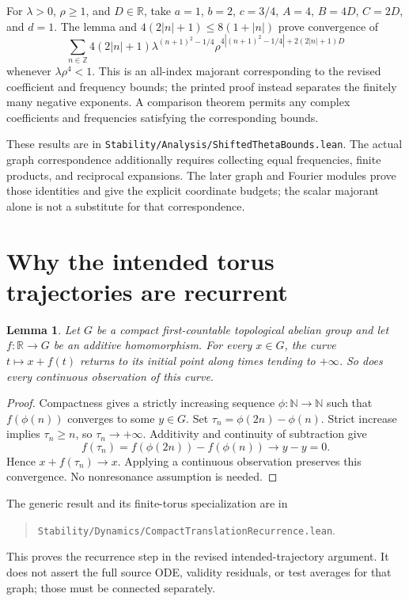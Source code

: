 \documentclass[11pt]{article}
\newtheorem{lemma}[theorem]{Lemma}
\newcommand{\R}{\mathbb R}
\newcommand{\N}{\mathbb N}
\newcommand{\Z}{\mathbb Z}
\newcommand{\code}[1]{{\small\nolinkurl{#1}}}
\begin{document}
For $\lambda>0$, $\rho\ge1$, and $D\in\R$, take $a=1$, $b=2$,
$c=3/4$, $A=4$, $B=4D$, $C=2D$, and $d=1$. The lemma and
$4(2|n|+1)\le8(1+|n|)$ prove convergence of
\[
 \sum_{n\in\Z}4(2|n|+1)\lambda^{(n+1)^2-1/4}
 \rho^{4|(n+1)^2-1/4|+2(2|n|+1)D}
\]
whenever $\lambda\rho^4<1$. This is an all-index majorant corresponding to
the revised coefficient and frequency bounds; the printed proof instead
separates the finitely many negative exponents. A comparison theorem permits any complex coefficients
and frequencies satisfying the corresponding bounds.

These results are in
\code{Stability/Analysis/ShiftedThetaBounds.lean}. The actual graph
correspondence additionally requires collecting equal frequencies, finite
products, and reciprocal expansions. The later graph and Fourier modules
prove those identities and give the explicit coordinate budgets; the
scalar majorant alone is not a substitute for that correspondence.

\section{Why the intended torus trajectories are recurrent}

\begin{lemma}
Let $G$ be a compact first-countable topological abelian group and let
$f:\R\to G$ be an additive homomorphism. For every $x\in G$, the curve
$t\mapsto x+f(t)$ returns to its initial point along times tending to
$+\infty$. So does every continuous observation of this curve.
\end{lemma}

\begin{proof}
Compactness gives a strictly increasing sequence $\phi:\N\to\N$ such
that $f(\phi(n))$ converges to some $y\in G$. Set
$\tau_n=\phi(2n)-\phi(n)$. Strict increase implies $\tau_n\ge n$, so
$\tau_n\to+\infty$. Additivity and continuity of subtraction give
\[
 f(\tau_n)=f(\phi(2n))-f(\phi(n))\longrightarrow y-y=0.
\]
Hence $x+f(\tau_n)\to x$. Applying a continuous observation preserves
this convergence. No nonresonance assumption is needed.
\end{proof}

The generic result and its finite-torus specialization are in
\begin{quote}
\code{Stability/Dynamics/CompactTranslationRecurrence.lean}.
\end{quote}
This proves
the recurrence step in the revised intended-trajectory argument. It does
not assert the full source ODE, validity residuals, or test averages for
that graph; those must be connected separately.
\end{document}
